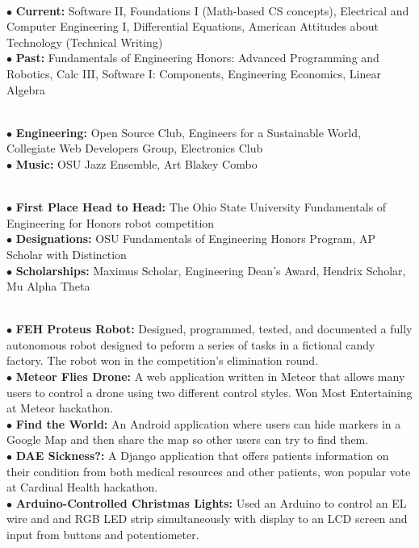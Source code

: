 \documentclass[10pt]{article}
\begin{document}
\\
$\bullet$ {\bf Current:} Software II, Foundations I (Math-based CS concepts), Electrical and Computer Engineering I, Differential Equations, American Attitudes about Technology (Technical Writing)\\
$\bullet$ {\bf Past:} Fundamentals of Engineering Honors: Advanced Programming and Robotics, Calc III, Software I: Components, Engineering Economics, Linear Algebra
\medskip

\\
\smallskip
$\bullet$ {\bf Engineering:} Open Source Club, Engineers for a Sustainable World, Collegiate Web Developers Group, Electronics Club\\
$\bullet$ {\bf Music:} OSU Jazz Ensemble, Art Blakey Combo
\medskip

\\
$\bullet$ {\bf First Place Head to Head:} The Ohio State University Fundamentals of Engineering for Honors robot competition\\
$\bullet$ {\bf Designations:} OSU Fundamentals of Engineering Honors Program, AP Scholar with Distinction\\
$\bullet$ {\bf Scholarships:} Maximus Scholar, Engineering Dean's Award, Hendrix Scholar, Mu Alpha Theta
\medskip

\\
$\bullet$ {\bf FEH Proteus Robot:} Designed, programmed, tested, and documented a fully autonomous robot designed to peform a series of tasks in a fictional candy factory. The robot won in the competition's elimination round.\\
$\bullet$ {\bf Meteor Flies Drone:} A web application written in Meteor that allows many users to control a drone using two different control styles. Won Most Entertaining at Meteor hackathon.\\
$\bullet$ {\bf Find the World:} An Android application where users can hide markers in a Google Map and then share the map so other users can try to find them.\\
$\bullet$ {\bf DAE Sickness?:} A Django application that offers patients information on their condition from both medical resources and other patients, won popular vote at Cardinal Health hackathon.\\
$\bullet$ {\bf Arduino-Controlled Christmas Lights:} Used an Arduino to control an EL wire and and RGB LED strip simultaneously with display to an LCD screen and input from buttons and potentiometer.
\medskip
\end{document}
